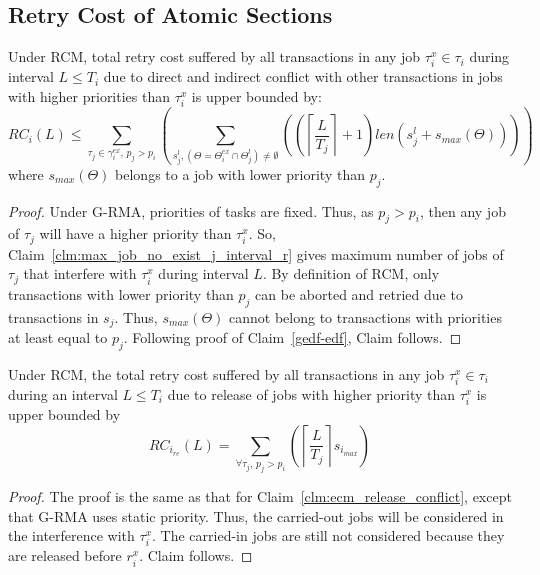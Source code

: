 \subsection{Retry Cost of Atomic Sections}
%
\begin{clm}\label{clm:rcm_retry_cost}
%
Under RCM, total retry cost suffered by all transactions in any job $\tau_i^x \in \tau_i$
during interval $L \le T_i$ due to direct and indirect conflict with other transactions in jobs with higher priorities than $\tau_i^x$ is upper bounded by:
% 
\begin{equation}
RC_i\left(L\right) \le \sum_{\tau_j \in \gamma_i^{ex},\,p_j > p_i}\left(\sum_{s_j^l,\left(\Theta=\Theta_i^{ex} \cap \Theta_j^l \right)\neq \emptyset}\left(\left(\left\lceil\frac{L}{T_{j}}\right\rceil+1\right)len\left(s_j^l+s_{max}\left(\Theta\right)\right)\right)\right)
\label{eq20}\end{equation} 
%
where $s_{max}\left(\Theta\right)$ belongs to a job with lower priority than $p_j$.
%
\end{clm}
%
\begin{proof}\normalfont
Under G-RMA, priorities of tasks are fixed. Thus, as $p_j > p_i$, then any job of $\tau_j$ will have a higher priority than $\tau_i^x$. So, Claim~\ref{clm:max_job_no_exist_j_interval_r} gives maximum number of jobs of $\tau_j$ that interfere with $\tau_i^x$ during interval $L$. By definition of RCM, only transactions with lower priority than $p_j$ can be aborted and retried due to transactions in $s_j$. Thus, $s_{max}\left(\Theta\right)$ cannot belong to transactions with priorities at least equal to $p_j$. Following proof of Claim~\ref{gedf-edf}, Claim follows.
%
\end{proof}
%
\begin{clm}\label{clm:rcm_release_conflict}
%
Under RCM, the total retry cost suffered by all transactions in any job $\tau_i^x \in \tau_i$ during an interval $L \le T_i$ due to release of jobs with higher priority than $\tau_i^x$ is upper bounded by 
%
\begin{equation}
RC_{i_{re}}(L)=\sum_{\forall \tau_j,\,p_j > p_i}\left(\left\lceil\frac{L}{T_j}\right\rceil s_{i_{max}}\right)\label{eq:rcm_release_conflict}
\end{equation}
%
\end{clm}
%
\begin{proof}
%
The proof is the same as that for Claim~\ref{clm:ecm_release_conflict}, except that G-RMA uses static priority. Thus, the carried-out jobs will be considered in the interference with $\tau_i^x$. The carried-in jobs are still not considered because they are released before $r_i^x$. Claim follows.
%
\end{proof}
